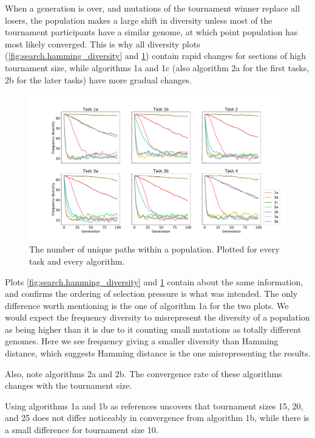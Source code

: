 When a generation is over, and mutations of the tournament winner replace all losers, the population makes a large shift in diversity unless most of the tournament participants have a similar genome, at which point population has most likely converged. This is why all diversity plots (\ref{fig:search.hamming_diversity} and \ref{fig:search.frequency_diversity_unique}) contain rapid changes for sections of high tournament size, while algorithms 1a and 1c (also algorithm 2a for the first tasks, 2b for the later tasks) have more gradual changes. 

\begin{figure}
    \includegraphics[width=1.2\textwidth,center]{Chapters/4.Experiments/exp2/figures/inuse/frequency_diversity_unique_path_count.pdf}
    \caption[Unique genome frequency diversity]{The number of unique paths within a population. Plotted for every task and every algorithm.}
    \label{fig:search.frequency_diversity_unique}
\end{figure}

Plots \ref{fig:search.hamming_diversity} and \ref{fig:search.frequency_diversity_unique} contain about the same information, and confirms the ordering of selection pressure is what was intended. The only difference worth mentioning is the one of algorithm 1a for the two plots. We would expect the frequency diversity to misrepresent the diversity of a population as being higher than it is due to it counting small mutations as totally different genomes. Here we see frequency giving a smaller diversity than Hamming distance, which suggests Hamming distance is the one misrepresenting the results. 

Also, note algorithms 2a and 2b. The convergence rate of these algorithms changes with the tournament size. 

Using algorithms 1a and 1b as references uncovers that tournament sizes 15, 20, and 25 does not differ noticeably in convergence from algorithm 1b, while there is a small difference for tournament size 10.

